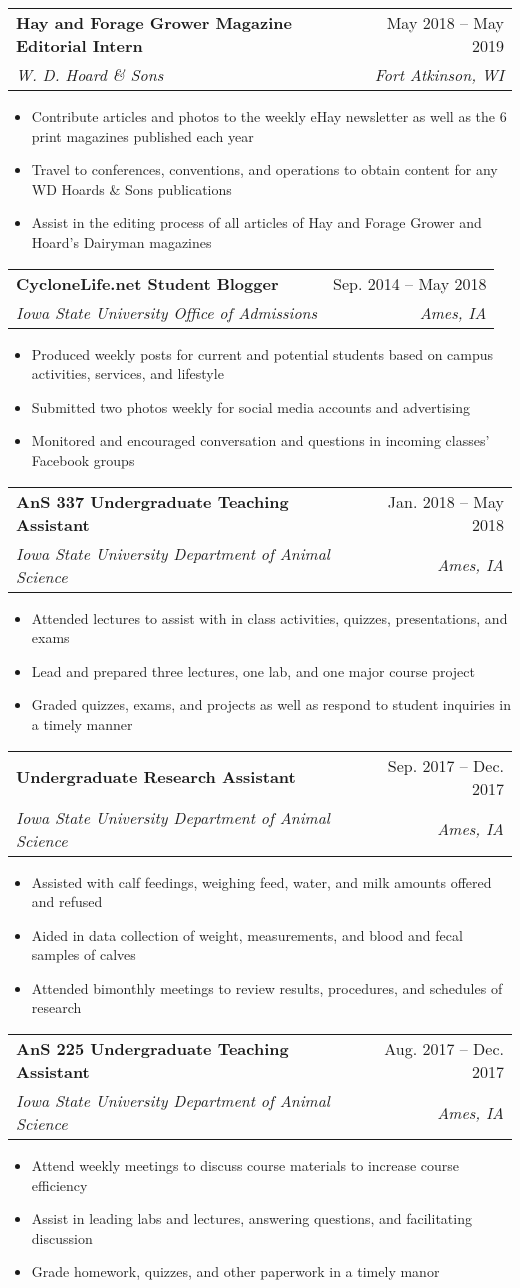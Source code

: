 \documentclass[letterpaper,11pt]{article}
\makeatletter
\newcommand{\resumeItem}[1]{
  \item\small{
    {#1 \vspace{-2pt}}
  }
}
\newcommand{\resumeSubheading}[4]{
  \vspace{-2pt}\item
    \begin{tabular*}{0.97\textwidth}[t]{l@{\extracolsep{\fill}}r}
      \textbf{#1} & #2 \\
      \textit{\small#3} & \textit{\small #4} \\
    \end{tabular*}\vspace{-7pt}
}
\newcommand{\resumeItemListStart}{\begin{itemize}}
\newcommand{\resumeItemListEnd}{\end{itemize}\vspace{-5pt}}
\makeatother
\begin{document}
    \resumeSubheading
      {Hay and Forage Grower Magazine Editorial Intern}{May 2018 -- May 2019}
      {W. D. Hoard \& Sons}{Fort Atkinson, WI}
      \resumeItemListStart
        \resumeItem{Contribute articles and photos to the weekly eHay newsletter as well as the 6 print magazines published each year}
        \resumeItem{Travel to conferences, conventions, and operations to obtain content for any WD Hoards \& Sons publications}
        \resumeItem{Assist in the editing process of all articles of Hay and Forage Grower and Hoard’s Dairyman magazines}
      \resumeItemListEnd

  \resumeSubheading
      {CycloneLife.net Student Blogger}{Sep. 2014 -- May 2018}
      {Iowa State University Office of Admissions}{Ames, IA}
      \resumeItemListStart
        \resumeItem{Produced weekly posts for current and potential students based on campus activities, services, and lifestyle}
        \resumeItem{Submitted two photos weekly for social media accounts and advertising}
        \resumeItem{Monitored and encouraged conversation and questions in incoming classes’ Facebook groups}
      \resumeItemListEnd

  \resumeSubheading
      {AnS 337 Undergraduate Teaching Assistant}{Jan. 2018 -- May 2018}
      {Iowa State University Department of Animal Science}{Ames, IA}
      \resumeItemListStart
        \resumeItem{Attended lectures to assist with in class activities, quizzes, presentations, and exams}
        \resumeItem{Lead and prepared three lectures, one lab, and one major course project}
        \resumeItem{Graded quizzes, exams, and projects as well as respond to student inquiries in a timely manner}
      \resumeItemListEnd

    \resumeSubheading
      {Undergraduate Research Assistant}{Sep. 2017 -- Dec. 2017}
      {Iowa State University Department of Animal Science}{Ames, IA}
      \resumeItemListStart
        \resumeItem{Assisted with calf feedings, weighing feed, water, and milk amounts offered and refused}
        \resumeItem{Aided in data collection of weight, measurements, and blood and fecal samples of calves}
        \resumeItem{Attended bimonthly meetings to review results, procedures, and schedules of research}
      \resumeItemListEnd

    \resumeSubheading
      {AnS 225 Undergraduate Teaching Assistant}{Aug. 2017 -- Dec. 2017}
      {Iowa State University Department of Animal Science}{Ames, IA}
      \resumeItemListStart
        \resumeItem{Attend weekly meetings to discuss course materials to increase course efficiency}
        \resumeItem{Assist in leading labs and lectures, answering questions, and facilitating discussion}
        \resumeItem{Grade homework, quizzes, and other paperwork in a timely manor}
      \resumeItemListEnd
\end{document}
